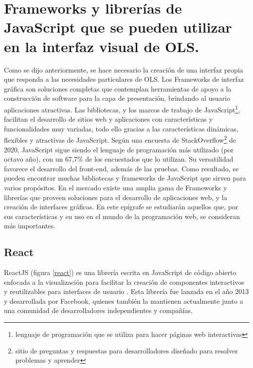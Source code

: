 \section{Frameworks y librer\'ias de JavaScript que se pueden utilizar en la interfaz visual de OLS.}

Como se dijo anteriormente, se hace necesario la creaci\'on de una interfaz propia que responda a las necesidades particulares de OLS. Los Frameworks de interfaz gr\'afica son soluciones completas que contemplan herramientas de apoyo a la construcci\'on de software para la capa de presentaci\'on, brindando al usuario aplicaciones atractivas. Las bibliotecas, y los marcos de trabajo de JavaScript\footnote{lenguaje de programaci\'on que se utiliza para hacer p\'aginas web interactivas}, facilitan el desarrollo de sitios web y aplicaciones con caracter\'isticas y funcionalidades muy variadas, todo ello gracias a las caracter\'isticas din\'amicas, flexibles y atractivas de JavaScript. Seg\'un una encuesta de StackOverflow\footnote{sitio de preguntas y respuestas para desarrolladores dise\~nado para resolver problemas y aprender} de 2020, JavaScript sigue siendo el lenguaje de programaci\'on m\'as utilizado (por octavo a\~no), con un 67,7\% de los encuestados que lo utilizan. Su versatilidad favorece el desarrollo del front-end, adem\'as de las pruebas. Como resultado, se pueden encontrar muchas bibliotecas y frameworks de JavaScript que sirven para varios prop\'ositos. En el mercado existe una amplia gama de Frameworks y librer\'ias que proveen soluciones para el desarrollo de aplicaciones web, y la creaci\'on de interfaces gr\'aficas. En este ep\'igrafe se estudiar\'an aquellos que, por sus caracter\'isticas y su uso en el mundo de la programaci\'on web, se consideran m\'as importantes.


\subsection{React}
ReactJS (figura \ref{react}) es una librer\'ia escrita en JavaScript de c\'odigo abierto enfocada a la visualizaci\'on para facilitar la creaci\'on de componentes interactivos y reutilizables para interfaces de usuario \cite{react}. Esta librer\'ia fue lanzada en el a\~no 2013 y desarrollada por Facebook, quienes tambi\'en la mantienen actualmente junto a una comunidad de desarrolladores independientes y compa\~n\'ias. 

